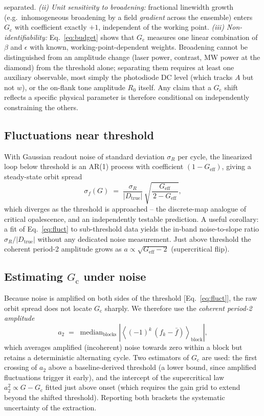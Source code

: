 \documentclass[11pt,a4paper]{article}
\newcommand{\Gc}{G_{\mathrm{c}}}
\newcommand{\Geff}{G_{\mathrm{eff}}}
\newcommand{\Dtrue}{D_{\mathrm{true}}}
\begin{document}
separated. \emph{(ii) Unit sensitivity to broadening:} fractional linewidth
growth (e.g.\ inhomogeneous broadening by a field \emph{gradient} across the
ensemble) enters $\Gc$ with coefficient exactly $+1$, independent of the
working point. \emph{(iii) Non-identifiability:} Eq.~\eqref{eq:budget} shows
that $\Gc$ measures one linear combination of $\beta$ and $\epsilon$ with
known, working-point-dependent weights. Broadening cannot be distinguished
from an amplitude change (laser power, contrast, MW power at the diamond) from
the threshold alone; separating them requires at least one auxiliary
observable, most simply the photodiode DC level (which tracks $A$ but not
$w$), or the on-flank tone amplitude $R_0$ itself. Any claim that a $\Gc$
shift reflects a specific physical parameter is therefore conditional on
independently constraining the others.

\subsection{Fluctuations near threshold}
\label{sec:fluct}

With Gaussian readout noise of standard deviation $\sigma_R$ per cycle, the
linearized loop below threshold is an AR(1) process with coefficient
$(1-\Geff)$, giving a steady-state orbit spread
\begin{equation}
\sigma_f(G) \;=\; \frac{\sigma_R}{|\Dtrue|}\,
\sqrt{\frac{\Geff}{\,2-\Geff\,}} ,
\label{eq:fluct}
\end{equation}
which diverges as the threshold is approached -- the discrete-map analogue of
critical opalescence, and an independently testable prediction. A useful
corollary: a fit of Eq.~\eqref{eq:fluct} to sub-threshold data yields the
in-band noise-to-slope ratio $\sigma_R/|\Dtrue|$ without any dedicated noise
measurement. Just above threshold the coherent period-2 amplitude grows as
$a \propto \sqrt{\Geff - 2}$ (supercritical flip).

\subsection{Estimating $\Gc$ under noise}
\label{sec:estimators}

Because noise is amplified on both sides of the threshold
[Eq.~\eqref{eq:fluct}], the raw orbit spread does not locate $\Gc$ sharply. We
therefore use the \emph{coherent period-2 amplitude}
\begin{equation}
a_2 \;=\; \operatorname{median}_{\mathrm{blocks}}
\left| \left\langle (-1)^{k}\,(f_k - \bar f) \right\rangle_{\mathrm{block}}
\right| ,
\label{eq:a2}
\end{equation}
which averages amplified (incoherent) noise towards zero within a block but
retains a deterministic alternating cycle. Two estimators of $\Gc$ are used:
the first crossing of $a_2$ above a baseline-derived threshold (a lower bound,
since amplified fluctuations trigger it early), and the intercept of the
supercritical law $a_2^{2} \propto G - \Gc$ fitted just above onset (which
requires the gain grid to extend beyond the shifted threshold). Reporting
both brackets the systematic uncertainty of the extraction.
\end{document}
